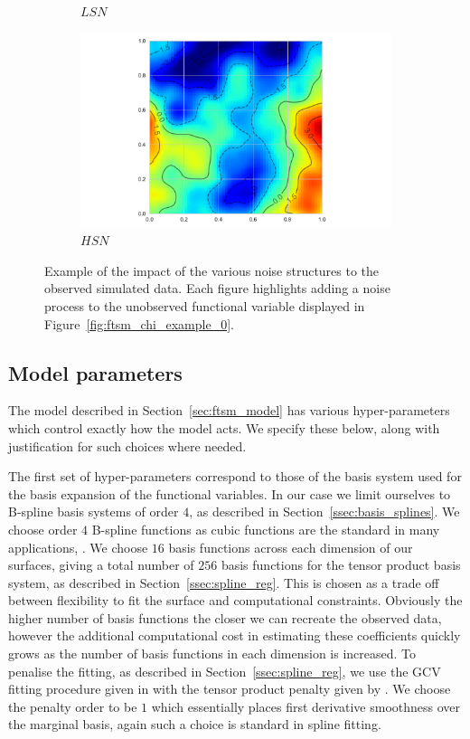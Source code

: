 \begin{figure}
\begin{subfigure}[b]{0.45\textwidth}
		\caption{$LSN$}
	\end{subfigure}
	\begin{subfigure}[b]{0.45\textwidth}
		\includegraphics[width=\textwidth]{sim_noise_example_hsn}
		\caption{$HSN$}
	\end{subfigure}  
	\caption{Example of the impact of the various noise structures to the observed simulated data. Each figure highlights adding a noise process to the unobserved functional variable displayed in Figure~\ref{fig:ftsm_chi_example_0}.}
	\label{fig:ftsm_noise_example}
\end{figure}

\subsection{Model parameters \label{ssec:sim_params}}
The model described in Section~\ref{sec:ftsm_model} has various hyper-parameters which control exactly how the model acts.
We specify these  below, along with justification for such choices where needed.

The first set of hyper-parameters correspond to those of the basis system used for the basis expansion of the functional variables.
In our case we limit ourselves to B-spline basis systems of order $4$, as described in Section~\ref{ssec:basis_splines}.
We choose order $4$ B-spline functions as cubic functions are the standard in many applications, \citep{de_boor_practical_2001}. 
We choose $16$ basis functions across each dimension of our surfaces, giving a total number of $256$ basis functions for the tensor product basis system, as described in Section~\ref{ssec:spline_reg}. 
This is chosen as a trade off between flexibility to fit the surface and computational constraints. 
Obviously the higher number of basis functions the closer we can recreate the observed data, however the additional computational cost in estimating these coefficients quickly grows as the number of basis functions in each dimension is increased.
To penalise the fitting, as described in Section~\ref{ssec:spline_reg}, we use the GCV fitting procedure given in \citep{wahba_spline_1990} with the tensor product penalty given by \citep{wood_p-splines_2017}.
We choose the penalty order to be $1$ which essentially places first derivative smoothness over the marginal basis, again such a choice is standard in spline fitting. 

